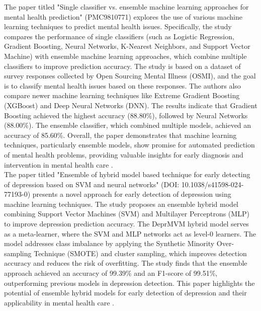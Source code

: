\noindent
The paper titled "Single classifier vs. ensemble machine learning approaches for mental health prediction" (PMC9810771) explores the use of various machine learning techniques to predict mental health issues. Specifically, the study compares the performance of single classifiers (such as Logistic Regression, Gradient Boosting, Neural Networks, K-Nearest Neighbors, and Support Vector Machine) with ensemble machine learning approaches, which combine multiple classifiers to improve prediction accuracy. The study is based on a dataset of survey responses collected by Open Sourcing Mental Illness (OSMI), and the goal is to classify mental health issues based on these responses. The authors also compare newer machine learning techniques like Extreme Gradient Boosting (XGBoost) and Deep Neural Networks (DNN). The results indicate that Gradient Boosting achieved the highest accuracy (88.80\%), followed by Neural Networks (88.00\%). The ensemble classifier, which combined multiple models, achieved an accuracy of 85.60\%. Overall, the paper demonstrates that machine learning techniques, particularly ensemble models, show promise for automated prediction of mental health problems, providing valuable insights for early diagnosis and intervention in mental health care \cite{Chung_2023}. \\


\noindent
The paper titled "Ensemble of hybrid model based technique for early detecting of depression based on SVM and neural networks" (DOI: 10.1038/s41598-024-77193-0) presents a novel approach for early detection of depression using machine learning techniques. The study proposes an ensemble hybrid model combining Support Vector Machines (SVM) and Multilayer Perceptrons (MLP) to improve depression prediction accuracy. The DeprMVM hybrid model serves as a meta-learner, where the SVM and MLP networks act as level-0 learners. The model addresses class imbalance by applying the Synthetic Minority Over-sampling Technique (SMOTE) and cluster sampling, which improves detection accuracy and reduces the risk of overfitting. The study finds that the ensemble approach achieved an accuracy of 99.39\% and an F1-score of 99.51\%, outperforming previous models in depression detection. This paper highlights the potential of ensemble hybrid models for early detection of depression and their applicability in mental health care \cite{Saha2024}. \\

